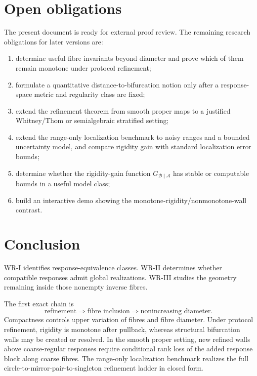 \documentclass[11pt]{article}
\newcommand{\Acal}{\mathcal A}
\newcommand{\Bcal}{\mathcal B}
\begin{document}
\section{Open obligations}

The present document is ready for external proof review. The remaining
research obligations for later versions are:

\begin{enumerate}
\item determine useful fibre invariants beyond diameter and prove which of
them remain monotone under protocol refinement;
\item formulate a quantitative distance-to-bifurcation notion only after a
response-space metric and regularity class are fixed;
\item extend the refinement theorem from smooth proper maps to a justified
Whitney/Thom or semialgebraic stratified setting;
\item extend the range-only localization benchmark to noisy ranges and a
bounded uncertainty model, and compare rigidity gain with standard localization
error bounds;
\item determine whether the rigidity-gain function
\(G_{\Bcal\mid\Acal}\) has stable or computable bounds in a useful model
class;
\item build an interactive demo showing the monotone-rigidity/nonmonotone-wall
contrast.
\end{enumerate}

\section*{Conclusion}

WR-I identifies response-equivalence classes. WR-II determines whether
compatible responses admit global realizations. WR-III studies the geometry
remaining inside those nonempty inverse fibres.

The first exact chain is
\[
\text{refinement}
\Longrightarrow
\text{fibre inclusion}
\Longrightarrow
\text{nonincreasing diameter}.
\]
Compactness controls upper variation of fibres and fibre diameter. Under
protocol refinement, rigidity is monotone after pullback, whereas structural
bifurcation walls may be created or resolved. In the smooth proper setting,
new refined walls above coarse-regular responses require conditional rank loss
of the added response block along coarse fibres. The range-only localization
benchmark realizes the full circle-to-mirror-pair-to-singleton refinement
ladder in closed form.
\end{document}
